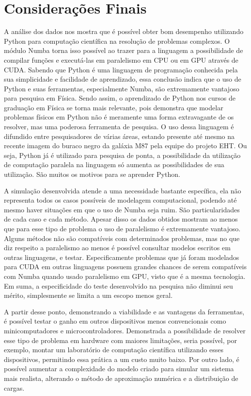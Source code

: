 \documentclass[
	12pt,				%
	a4paper,			%
	english,			%
	openright,				%
	brazil,				%
	oneside]{abntex2}
\begin{document}
\chapter[Considerações Finais]{Considerações Finais}
	A análise dos dados nos mostra que é possível obter bom desempenho utilizando Python para computação científica na resolução de problemas complexos. O módulo Numba torna isso possível ao trazer para a linguagem a possibilidade de compilar funções e executá-las em paralelismo em CPU ou em GPU através de CUDA. Sabendo que Python é uma linguagem de programação conhecida pela sua simplicidade e facilidade de aprendizado, essa conclusão indica que o uso de Python e suas ferramentas, especialmente Numba, são extremamente vantajoso para pesquisa em Física. Sendo assim, o aprendizado de Python nos cursos de graduação em Física se torna mais relevante, pois demonstra que modelar problemas físicos em Python não é meramente uma forma extravagante de os resolver, mas uma poderosa ferramenta de pesquisa. O uso dessa linguagem é difundido entre pesquisadores de várias áreas, estando presente até mesmo na recente imagem do buraco negro da galáxia M87 pela equipe do projeto EHT. Ou seja, Python já é utilizado para pesquisa de ponta, a possibilidade da utilização de computação paralela na linguagem só aumenta as possibilidades de sua utilização. São muitos os motivos para se aprender Python.
	
	A simulação desenvolvida atende a uma necessidade bastante específica, ela não representa todos os casos possíveis de modelagem computacional, podendo até mesmo haver situações em que o uso de Numba seja ruim. São particularidades de cada caso e cada método. Apesar disso os dados obtidos mostram ao menos que para esse tipo de problema o uso de paralelismo é extremamente vantajoso. Alguns métodos não são compatíveis com determinados problemas, mas no que diz respeito a paralelismo ao menos é possível consultar modelos escritos em outras linguagens, e testar. Especificamente problemas que já foram modelados para CUDA em outras linguagens possuem grandes chances de serem compatíveis com Numba quando usado paralelismo em GPU, visto que é a mesma tecnologia. Em suma, a especificidade do teste desenvolvido na pesquisa não diminui seu mérito, simplesmente se limita a um escopo menos geral.
	
	A partir desse ponto, demonstrando a viabilidade e as vantagens da ferramentas, é possível testar o ganho em outros dispositivos menos convencionais como minicomputadores e microcontroladores. Demonstrada a possibilidade de resolver esse tipo de problema em hardware com maiores limitações, seria possível, por exemplo, montar um laboratório de computação científica utilizando esses dispositivos, permitindo essa prática a um custo muito baixo. Por outro lado, é possível aumentar a complexidade do modelo criado para simular um sistema mais realista, alterando o método de aproximação numérica e a distribuição de cargas.
	
\end{document}
